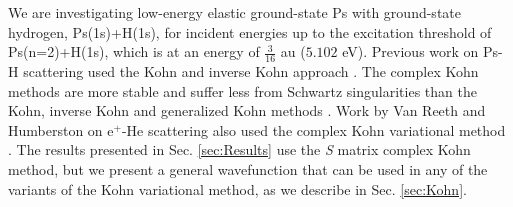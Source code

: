 \documentclass[preprint,showpacs,preprintnumbers,amsmath,amssymb,longbibliography,pra,aps]{revtex4-1}
\begin{document}
We are investigating low-energy elastic ground-state Ps with ground-state hydrogen, Ps(1s)+H(1s), for incident energies up to the excitation threshold of Ps(n=2)+H(1s), which is at an energy of $\tfrac{3}{16}$ au ($5.102$ eV). Previous work on Ps-H scattering used the Kohn and inverse Kohn approach \cite{VanReeth2003, VanReeth2004}. The complex Kohn methods are more stable and suffer less from Schwartz singularities than the Kohn, inverse Kohn and generalized Kohn methods \cite{Lucchese1989,Cooper2009,Cooper2010}. Work by Van Reeth and Humberston on e$^+$-He scattering also used the complex Kohn variational method \cite{VanReeth1999}. The results presented in Sec. \ref{sec:Results} use the \emph{S} matrix complex Kohn method, but we present a general wavefunction that can be used in any of the variants of the Kohn variational method, as we describe in Sec. \ref{sec:Kohn}.
\end{document}
